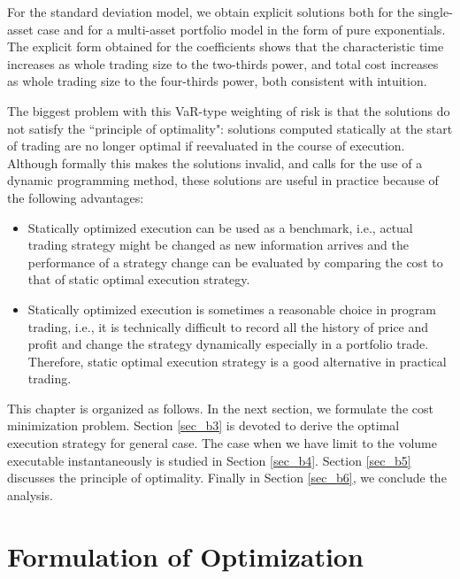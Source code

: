 For the standard deviation model, we obtain explicit solutions both for the single-asset case and for a multi-asset portfolio model in the form of pure exponentials.  The explicit form obtained for the coefficients shows that the characteristic time increases as whole trading size to the two-thirds power, and total cost increases as whole trading size to the four-thirds power, both consistent with intuition.

The biggest problem with this VaR-type weighting of risk is that the solutions  do not satisfy the ``principle of optimality": solutions computed statically at the start of trading are no longer optimal if reevaluated in the course of execution. Although formally this makes the solutions invalid, and calls for the use of a dynamic programming method, these solutions are useful in practice because of the following advantages:
\begin{itemize}
 \item Statically optimized execution can be used as a benchmark, i.e., actual trading strategy
might be changed as new information arrives and the performance of a strategy change can be
evaluated by comparing the cost to that of static optimal execution strategy.
 \item Statically optimized execution is sometimes a reasonable choice in program trading, i.e., it is
technically difficult to record all the history of price and profit and change the strategy
dynamically especially in a portfolio trade.  Therefore, static optimal execution strategy is a good
alternative in practical trading.
\end{itemize}

This chapter is organized as follows.  In the next section, we formulate the cost minimization problem.  Section \ref{sec_b3} is devoted to derive the optimal execution strategy for general case.  The case when we have limit to the volume executable instantaneously is studied in Section \ref{sec_b4}.  Section \ref{sec_b5} discusses the principle of optimality.  Finally in Section \ref{sec_b6}, we conclude the analysis.

\section{Formulation of Optimization}\label{sec_b2}

